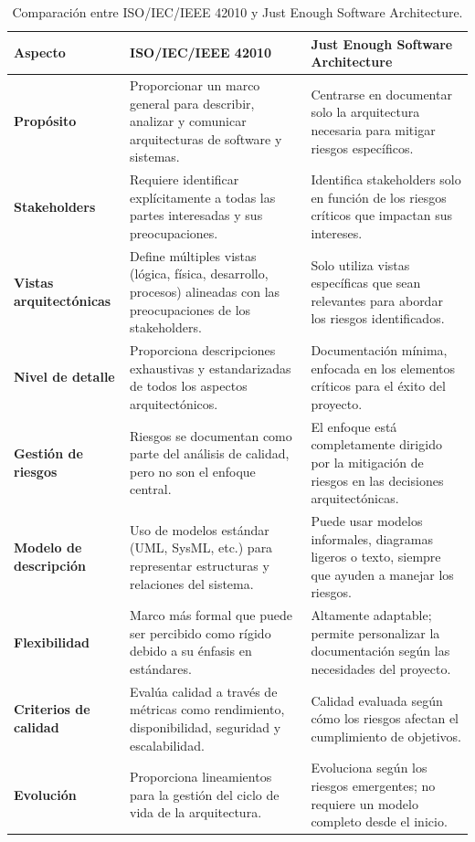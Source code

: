 \begin{table}[h!]
\centering
\begin{tabular}{@{}p{4cm}p{6cm}p{6cm}@{}}
\toprule
\textbf{Aspecto}              & \textbf{ISO/IEC/IEEE 42010}                                                                 & \textbf{Just Enough Software Architecture}                              \\ \midrule
\textbf{Propósito}            & Proporcionar un marco general para describir, analizar y comunicar arquitecturas de software y sistemas. & Centrarse en documentar solo la arquitectura necesaria para mitigar riesgos específicos. \\ \midrule
\textbf{Stakeholders}         & Requiere identificar explícitamente a todas las partes interesadas y sus preocupaciones.    & Identifica stakeholders solo en función de los riesgos críticos que impactan sus intereses. \\ \midrule
\textbf{Vistas arquitectónicas} & Define múltiples vistas (lógica, física, desarrollo, procesos) alineadas con las preocupaciones de los stakeholders. & Solo utiliza vistas específicas que sean relevantes para abordar los riesgos identificados. \\ \midrule
\textbf{Nivel de detalle}     & Proporciona descripciones exhaustivas y estandarizadas de todos los aspectos arquitectónicos. & Documentación mínima, enfocada en los elementos críticos para el éxito del proyecto. \\ \midrule
\textbf{Gestión de riesgos}   & Riesgos se documentan como parte del análisis de calidad, pero no son el enfoque central.   & El enfoque está completamente dirigido por la mitigación de riesgos en las decisiones arquitectónicas. \\ \midrule
\textbf{Modelo de descripción} & Uso de modelos estándar (UML, SysML, etc.) para representar estructuras y relaciones del sistema. & Puede usar modelos informales, diagramas ligeros o texto, siempre que ayuden a manejar los riesgos. \\ \midrule
\textbf{Flexibilidad}         & Marco más formal que puede ser percibido como rígido debido a su énfasis en estándares.      & Altamente adaptable; permite personalizar la documentación según las necesidades del proyecto. \\ \midrule
\textbf{Criterios de calidad} & Evalúa calidad a través de métricas como rendimiento, disponibilidad, seguridad y escalabilidad. & Calidad evaluada según cómo los riesgos afectan el cumplimiento de objetivos. \\ \midrule
\textbf{Evolución}            & Proporciona lineamientos para la gestión del ciclo de vida de la arquitectura.               & Evoluciona según los riesgos emergentes; no requiere un modelo completo desde el inicio. \\ \bottomrule
\end{tabular}
\caption{Comparación entre ISO/IEC/IEEE 42010 y Just Enough Software Architecture.}
\label{tab:comparison}
\end{table}

